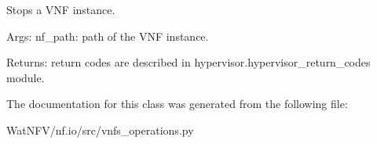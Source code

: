 Stops a V\-N\-F instance. 

Args\-: nf\-\_\-path\-: path of the V\-N\-F instance.

Returns\-: return codes are described in hypervisor.\-hypervisor\-\_\-return\-\_\-codes module. 

The documentation for this class was generated from the following file\-:\begin{DoxyCompactItemize}
\item 
Wat\-N\-F\-V/nf.\-io/src/vnfs\-\_\-operations.\-py\end{DoxyCompactItemize}
